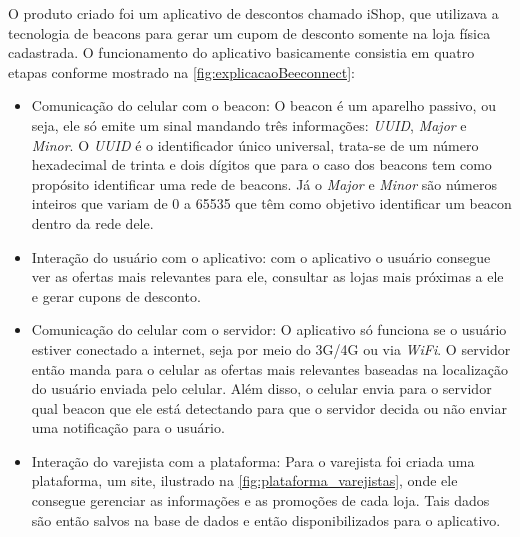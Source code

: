 O produto criado foi um aplicativo de descontos chamado iShop, que utilizava a tecnologia de beacons para gerar um cupom de desconto somente na loja física cadastrada. O funcionamento do aplicativo basicamente consistia em quatro etapas conforme mostrado na \autoref{fig:explicacaoBeeconnect}:
\begin{itemize}
\item Comunicação do celular com o beacon: O beacon é um aparelho passivo, ou seja, ele só emite um sinal mandando três informações: \textit{UUID}, \textit{Major} e \textit{Minor}. O \textit{UUID} é o identificador único universal, trata-se de um número hexadecimal de trinta e dois dígitos que para o caso dos beacons tem como propósito identificar uma rede de beacons. Já o \textit{Major} e \textit{Minor} são números inteiros que variam de 0 a 65535 que têm como objetivo identificar um beacon dentro da rede dele.
\item Interação do usuário com o aplicativo: com o aplicativo o usuário consegue ver as ofertas mais relevantes para ele, consultar as lojas mais próximas a ele e gerar cupons de desconto.
\item Comunicação do celular com o servidor: O aplicativo só funciona se o usuário estiver conectado a internet, seja por meio do 3G/4G ou via \textit{WiFi}. O servidor então manda para o celular as ofertas mais relevantes baseadas na localização do usuário enviada pelo celular. Além disso, o celular envia para o servidor qual beacon que ele está detectando para que o servidor decida ou não enviar uma notificação para o usuário.
\item Interação do varejista com a plataforma: Para o varejista foi criada uma plataforma, um site, ilustrado na \autoref{fig:plataforma_varejistas}, onde ele consegue gerenciar as informações e as promoções de cada loja. Tais dados são então salvos na base de dados e então disponibilizados para o aplicativo.
\end{itemize}

